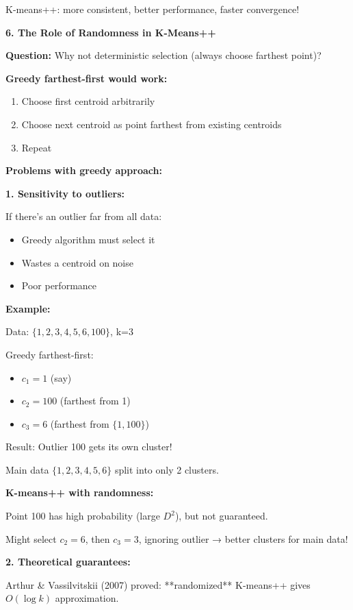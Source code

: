 \documentclass[12pt]{article}
\begin{document}
\begin{explanation}
K-means++: more consistent, better performance, faster convergence!

\textbf{6. The Role of Randomness in K-Means++}

\textbf{Question:} Why not deterministic selection (always choose farthest point)?

\textbf{Greedy farthest-first would work:}

\begin{enumerate}
    \item Choose first centroid arbitrarily
    \item Choose next centroid as point farthest from existing centroids
    \item Repeat
\end{enumerate}

\textbf{Problems with greedy approach:}

\textbf{1. Sensitivity to outliers:}

If there's an outlier far from all data:
\begin{itemize}
    \item Greedy algorithm must select it
    \item Wastes a centroid on noise
    \item Poor performance
\end{itemize}

\textbf{Example:}

Data: $\{1, 2, 3, 4, 5, 6, 100\}$, k=3

Greedy farthest-first:
\begin{itemize}
    \item $c_1 = 1$ (say)
    \item $c_2 = 100$ (farthest from 1)
    \item $c_3 = 6$ (farthest from $\{1, 100\}$)
\end{itemize}

Result: Outlier 100 gets its own cluster!

Main data $\{1,2,3,4,5,6\}$ split into only 2 clusters.

\textbf{K-means++ with randomness:}

Point 100 has high probability (large $D^2$), but not guaranteed.

Might select $c_2 = 6$, then $c_3 = 3$, ignoring outlier → better clusters for main data!

\textbf{2. Theoretical guarantees:}

Arthur & Vassilvitskii (2007) proved: **randomized** K-means++ gives $O(\log k)$ approximation.


\end{explanation}
\end{document}
